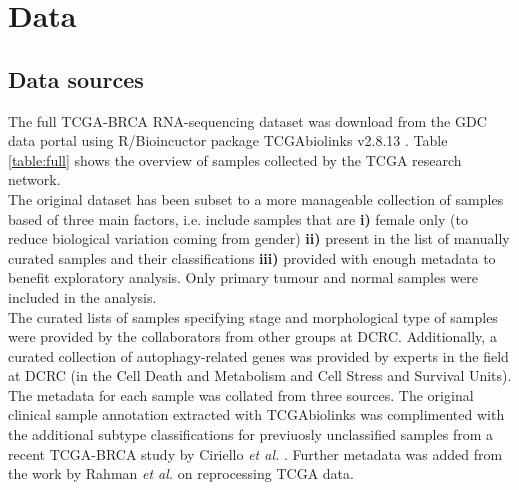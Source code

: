 \section{Data}
    \subsection{Data sources}
    
    The full TCGA-BRCA RNA-sequencing dataset was download from the GDC data portal using R/Bioincuctor package TCGAbiolinks v2.8.13
\cite{Colaprico2016}. Table \ref{table:full} shows the overview of samples collected by the TCGA research network. \\
    The original dataset has been subset to a more manageable collection of samples based of three main factors, i.e. include samples that are\textbf{ i)} female only (to reduce biological variation coming from gender) \textbf{ii)} present in the list of manually curated samples and their classifications \textbf{iii)} provided with enough metadata to benefit exploratory analysis. Only primary tumour and normal samples were included in the analysis.\\
    
    The curated lists of samples specifying stage and morphological type of samples were provided by the collaborators from other groups at DCRC.
    Additionally, a curated collection of autophagy-related genes was provided by experts in the field at DCRC (in the Cell Death and Metabolism and Cell Stress and Survival Units).\\
    
    The metadata for each sample was collated from three sources. The original clinical sample annotation extracted with TCGAbiolinks was complimented with the additional subtype classifications for previuosly unclassified samples from a recent TCGA-BRCA study by Ciriello \textit{et al.} \cite{Ciriello2015ComprehensiveCancer}. Further metadata was added from the work by Rahman \textit{et al. }\cite{RahmanAlternativeResults} on reprocessing TCGA data. \\   
    
